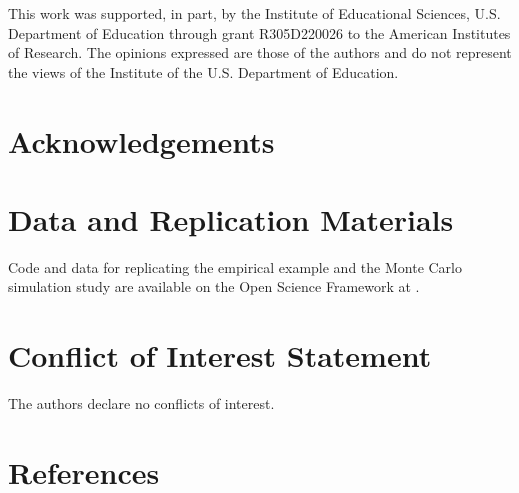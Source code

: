 \documentclass[
  man, donotrepeattitle,floatsintext]{apa7}
\begin{document}
This work was supported, in part, by the Institute of Educational Sciences, U.S. Department of Education through grant R305D220026 to the American Institutes of Research.
The opinions expressed are those of the authors and do not represent the views of the Institute of the U.S. Department of Education.

\section*{Acknowledgements}\label{acknowledgements}

\section*{Data and Replication Materials}\label{data-and-replication-materials}

Code and data for replicating the empirical example and the Monte Carlo simulation study are available on the Open Science Framework at .

\section*{Conflict of Interest Statement}\label{conflict-of-interest-statement}

The authors declare no conflicts of interest.

\section*{References}\label{references}

\begingroup
\end{document}
